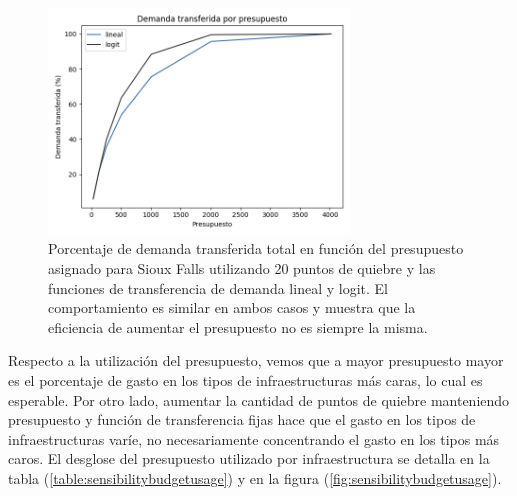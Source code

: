 \documentclass{article}
\begin{document}
  \begin{figure}[h!]
    \centering
    \includegraphics[width=8cm]{../resources/demand_by_budget.png}
      \caption{Porcentaje de demanda transferida total en función del presupuesto asignado para Sioux Falls utilizando 20 puntos de quiebre y las funciones de transferencia de demanda lineal y logit. El comportamiento es similar en ambos casos y muestra que la eficiencia de aumentar el presupuesto no es siempre la misma.}
    \label{fig:demandtransferbybudgetlinear}
  \end{figure}

  Respecto a la utilización del presupuesto, vemos que a mayor presupuesto mayor es el porcentaje de gasto en los tipos de infraestructuras más caras, lo cual es esperable. Por otro lado, aumentar la cantidad de puntos de quiebre manteniendo presupuesto y función de transferencia fijas hace que el gasto en los tipos de infraestructuras varíe, no necesariamente concentrando el gasto en los tipos más caros. El desglose del presupuesto utilizado por infraestructura se detalla en la tabla (\ref{table:sensibilitybudgetusage}) y en la figura (\ref{fig:sensibilitybudgetusage}).
\end{document}
